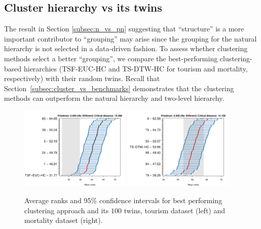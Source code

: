 \documentclass[a4paper,review,12pt,authoryear]{elsarticle}
\begin{document}
\subsection{Cluster hierarchy vs its twins}
\label{subsec:P3_c_vs_pc}

The result in Section \ref{subsec:n_vs_pn} suggesting that ``structure'' is a more important contributor to ``grouping'' may arise since the grouping for the natural hierarchy is not selected in a data-driven fashion. %
To assess whether clustering methods select a better ``grouping'', we compare the best-performing clustering-based hierarchies (TSF-EUC-HC and TS-DTW-HC for tourism and mortality, respectively) with their random twins.  Recall that Section~\ref{subsec:cluster_vs_benchmarks} demonstrates that the clustering methods can outperform the natural hierarchy and two-level hierarchy. 

\begin{figure}[h!]
    \centering
    \includegraphics[width=0.47\textwidth]{figures/hierarchy_rmsse/tourism/P3_cluster_vs_pc_h12.pdf}
    \includegraphics[width=0.47\textwidth]{figures/hierarchy_rmsse/mortality/P3_cluster_vs_pc_h12.pdf}
    \caption{\label{fig:P3_tourism_c_vs_pc}Average ranks and 95\% confidence intervals for best performing clustering approach and its $100$ twins, tourism dataset (left) and mortality dataset (right).}
\end{figure}
\end{document}
